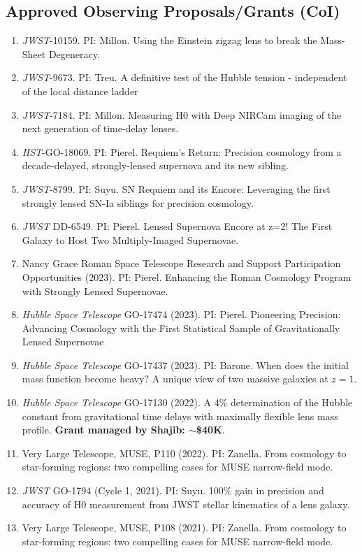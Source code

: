 \documentclass[margin, line]{res}
\begin{document}
\begin{resume}
\section{\sc Approved Observing Proposals/Grants (CoI)}
\begin{enumerate}
\item \textit{JWST}-10159. PI: Millon. Using the Einstein zigzag lens to break the Mass-Sheet Degeneracy.
\item \textit{JWST}-9673. PI: Treu. A definitive test of the Hubble tension - independent of the local distance ladder
\item \textit{JWST}-7184. PI: Millon. Measuring H0 with Deep NIRCam imaging of the next generation of time-delay lenses.
\item \textit{HST}-GO-18069. PI: Pierel. Requiem's Return: Precision cosmology from a decade-delayed, strongly-lensed supernova and its new sibling.
\item \textit{JWST}-8799. PI: Suyu. SN Requiem and its Encore: Leveraging the first strongly lensed SN-Ia siblings for precision cosmology.  
\item \textit{JWST} DD-6549. PI: Pierel. Lensed Supernova Encore at z=2! The First Galaxy to Host Two Multiply-Imaged Supernovae. 
\item Nancy Grace Roman Space Telescope Research and Support Participation Opportunities (2023). PI: Pierel. Enhancing the Roman Cosmology Program with Strongly Lensed Supernovae.
\item \textit{Hubble Space Telescope} GO-17474 (2023). PI: Pierel. Pioneering Precision: Advancing Cosmology with the First Statistical Sample of Gravitationally Lensed Supernovae
\item \textit{Hubble Space Telescope} GO-17437 (2023). PI: Barone. When does the initial mass function become heavy? A unique view of two massive galaxies at $z=1$.
\item \textit{Hubble Space Telescope} GO-17130 (2022). A 4\% determination of the Hubble constant from gravitational time delays with maximally flexible lens mass profile. \textbf{Grant managed by Shajib: $\sim$\$40K}.
\item Very Large Telescope, MUSE, P110 (2022). PI: Zanella. From cosmology to star-forming regions: two compelling cases for MUSE narrow-field mode.
\item \textit{JWST} GO-1794 (Cycle 1, 2021). PI: Suyu. 100\% gain in precision and accuracy of H0 measurement from JWST stellar kinematics of a lens galaxy. 
\item Very Large Telescope, MUSE, P108 (2021). PI: Zanella. From cosmology to star-forming regions: two compelling cases for MUSE narrow-field mode.

\end{enumerate}
\end{resume}
\end{document}
